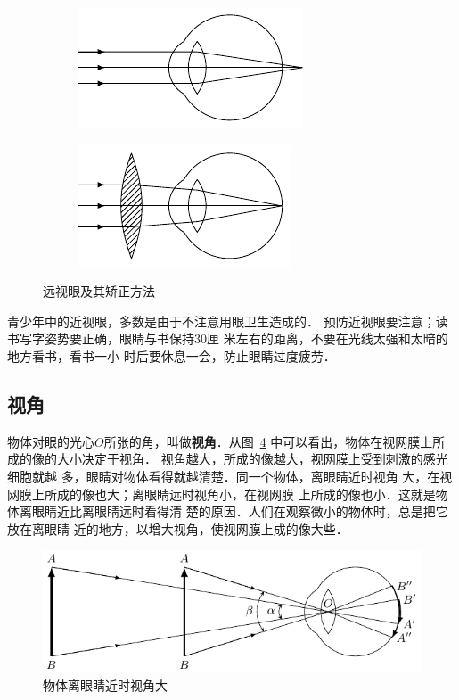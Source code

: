 \begin{figure}[htbp]
    \centering
    \begin{subfigure}{0.4\linewidth}
        \centering
        \includegraphics{fig/C/5-51a.pdf}
        \caption{}\label{fig_C_5-51a}
    \end{subfigure}
    \hfil
    \begin{subfigure}{0.4\linewidth}
        \centering
        \includegraphics{fig/C/5-51b.pdf}
        \caption{}\label{fig_C_5-51b}
    \end{subfigure}
    \caption{远视眼及其矫正方法}\label{fig_C_5-51}
\end{figure}

青少年中的近视眼，多数是由于不注意用眼卫生造成的．
预防近视眼要注意；读书写字姿势要正确，眼睛与书保持30厘
米左右的距离，不要在光线太强和太暗的地方看书，看书一小
时后要休息一会，防止眼睛过度疲劳．

\subsection{视角}

物体对眼的光心$O$所张的角，叫做\textbf{视角}．从图~\ref{fig_C_5-52} 中可以看出，物体在视网膜上所成的像的大小决定于视角．
视角越大，所成的像越大，视网膜上受到刺激的感光细胞就越
多，眼睛对物体看得就越清楚．同一个物体，离眼睛近时视角
大，在视网膜上所成的像也大；离眼睛远时视角小，在视网膜
上所成的像也小．这就是物体离眼睛近比离眼睛远时看得清
楚的原因．人们在观察微小的物体时，总是把它放在离眼睛
近的地方，以增大视角，使视网膜上成的像大些．

\begin{figure}[htbp]
    \centering
    \includegraphics{fig/C/5-52.pdf}
    \caption{物体离眼睛近时视角大}\label{fig_C_5-52}
\end{figure}

